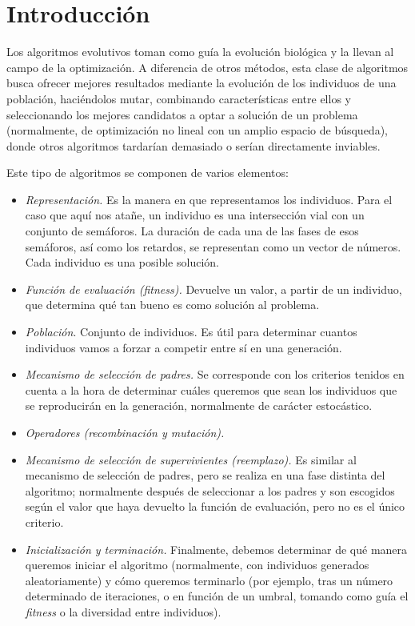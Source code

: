 \chapter{Introducción}
\label{cap:1-intro}

Los algoritmos evolutivos toman como guía la evolución biológica y la llevan al campo de la optimización. A diferencia de otros métodos, esta clase de algoritmos busca ofrecer mejores resultados mediante la evolución de los individuos de una población, haciéndolos mutar, combinando características entre ellos y seleccionando los mejores candidatos a optar a solución de un problema~\cite{eiben_introduction_2003} (normalmente, de optimización no lineal con un amplio espacio de búsqueda), donde otros algoritmos tardarían demasiado o serían directamente inviables.

Este tipo de algoritmos se componen de varios elementos:

\begin{itemize}
    \item \textit{Representación.} Es la manera en que representamos los individuos. Para el caso que aquí nos atañe, un individuo es una intersección vial con un conjunto de semáforos. La duración de cada una de las fases de esos semáforos, así como los retardos, se representan como un vector de números. Cada individuo es una posible solución.
    \item \textit{Función de evaluación (fitness).} Devuelve un valor, a partir de un individuo, que determina qué tan bueno es como solución al problema.
    \item \textit{Población}. Conjunto de individuos. Es útil para determinar cuantos individuos vamos a forzar a competir entre sí en una generación.
    \item \textit{Mecanismo de selección de padres.} Se corresponde con los criterios tenidos en cuenta a la hora de determinar cuáles queremos que sean los individuos que se reproducirán en la generación, normalmente de carácter estocástico.
    \item \textit{Operadores (recombinación y mutación).} 
    \item \textit{Mecanismo de selección de supervivientes (reemplazo).} Es similar al mecanismo de selección de padres, pero se realiza en una fase distinta del algoritmo; normalmente después de seleccionar a los padres y son escogidos según el valor que haya devuelto la función de evaluación, pero no es el único criterio.
    \item \textit{Inicialización y terminación.} Finalmente, debemos determinar de qué manera queremos iniciar el algoritmo (normalmente, con individuos generados aleatoriamente) y cómo queremos terminarlo (por ejemplo, tras un número determinado de iteraciones, o en función de un umbral, tomando como guía el \textit{fitness} o la diversidad entre individuos).
\end{itemize}

